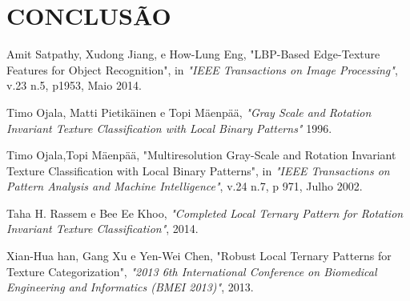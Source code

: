 \documentclass[a4paper,twocolumn]{article}
\begin{document}
\section{CONCLUSÃO}


\begin{thebibliography}{5}
      Amit Satpathy, Xudong Jiang, e How-Lung Eng,
      "LBP-Based Edge-Texture Features for Object Recognition",
      in \emph{"IEEE Transactions on Image Processing"},
      v.23 n.5,
      p1953,
      Maio 2014.

     Timo Ojala, Matti Pietikäinen e Topi Mäenpää,
     \emph{"Gray Scale and Rotation Invariant Texture Classification with Local Binary Patterns"}
     1996.
     
     Timo Ojala,Topi Mäenpää,
     "Multiresolution Gray-Scale and Rotation Invariant Texture Classification with Local Binary Patterns",
     in \emph{"IEEE Transactions on Pattern Analysis and Machine Intelligence"},
     v.24 n.7,
     p 971,
     Julho 2002.

     Taha H. Rassem e Bee Ee Khoo,
     \emph{"Completed Local Ternary Pattern for Rotation Invariant Texture Classification"},
     2014.
     
      
     Xian-Hua han, Gang Xu e Yen-Wei Chen,
     "Robust Local Ternary Patterns for Texture Categorization",
     \emph{"2013 6th International Conference on Biomedical Engineering and Informatics (BMEI 2013)"},
     2013.
     
     
     
\end{thebibliography}
\end{document}
